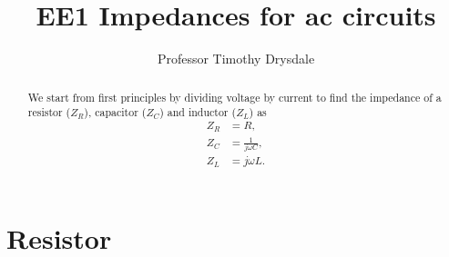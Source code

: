 \documentclass{tufte-handout}
\title{EE1 Impedances for ac circuits}
\author{Professor Timothy Drysdale}
\begin{document}
\maketitle


\begin{abstract}
\noindent
We start from first principles by dividing voltage by current to find the impedance of a resistor ($Z_R$), capacitor ($Z_C$) and inductor ($Z_L$) as
\begin{align*} 
Z_R &= R, \\
Z_C &= \frac{1}{j\omega C}, \\
Z_L &= j\omega L.
\end{align*}
\end{abstract}

\section{Resistor}
\end{document}
